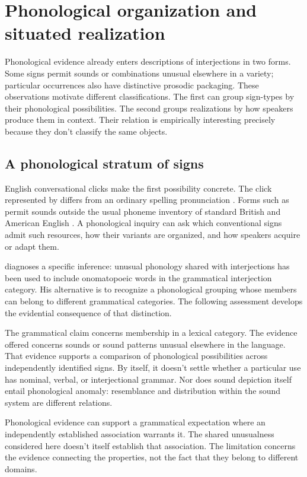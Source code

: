 \documentclass[12pt]{article}
\begin{document}
\section{Phonological organization and situated realization}\label{sec:phonology}

Phonological evidence already enters descriptions of interjections in two
forms. Some signs permit sounds or combinations unusual elsewhere in a
variety; particular occurrences also have distinctive prosodic packaging.
These observations motivate different classifications. The first can group
sign-types by their phonological possibilities. The second groups realizations
by how speakers produce them in context. Their relation is empirically
interesting precisely because they don't classify the same objects.

\subsection{A phonological stratum of signs}

English conversational clicks make the first possibility concrete. The
click represented by  differs from an ordinary spelling
pronunciation \citep[147]{wilkins1992}. Forms such as  permit
sounds outside the usual phoneme inventory of standard British and
American English \citep[853]{quirk1985}. A phonological inquiry can
ask which conventional signs admit such resources, how their variants are
organized, and how speakers acquire or adapt them.

\textcite[112--113]{ameka1992} diagnoses a specific inference: unusual
phonology shared with interjections has been used to include onomatopoeic
words in the grammatical interjection category. His alternative is to
recognize a phonological grouping whose members can belong to different
grammatical categories. The following assessment develops the evidential
consequence of that distinction.

The grammatical claim concerns membership in a lexical category. The
evidence offered concerns sounds or sound patterns unusual elsewhere in
the language. That evidence supports a comparison of phonological
possibilities across independently identified signs. By itself, it doesn't
settle whether a particular use has nominal, verbal, or interjectional
grammar. Nor does sound depiction itself entail phonological anomaly: resemblance
and distribution within the sound system are different relations.

Phonological evidence can support a grammatical expectation where an
independently established association warrants it. The shared unusualness
considered here doesn't itself establish that association. The limitation
concerns the evidence connecting the properties, not the fact that they
belong to different domains.
\end{document}
